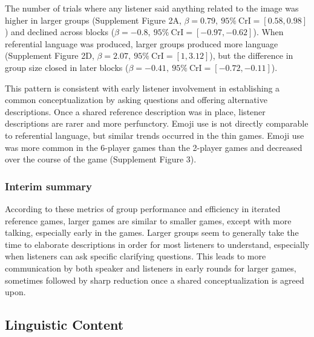 \documentclass[
  english,
  a4paper,
]{article}
\begin{document}
The number of trials where any listener said anything related to the image was higher in larger groups (Supplement Figure 2A, \(\beta=0.79,\:95\%\:\mathrm{CrI}=[0.58, 0.98]\)) and declined across blocks (\(\beta=-0.8,\:95\%\:\mathrm{CrI}=[-0.97, -0.62]\)). When referential language was produced, larger groups produced more language (Supplement Figure 2D, \(\beta=2.07,\:95\%\:\mathrm{CrI}=[1, 3.12]\)), but the difference in group size closed in later blocks (\(\beta=-0.41,\:95\%\:\mathrm{CrI}=[-0.72, -0.11]\)).

This pattern is consistent with early listener involvement in establishing a common conceptualization by asking questions and offering alternative descriptions. Once a shared reference description was in place, listener descriptions are rarer and more perfunctory.
Emoji use is not directly comparable to referential language, but similar trends occurred in the thin games.
Emoji use was more common in the 6-player games than the 2-player games and decreased over the course of the game (Supplement Figure 3).

\hypertarget{interim-summary}{%
\subsubsection{Interim summary}\label{interim-summary}}

According to these metrics of group performance and efficiency in iterated reference games, larger games are similar to smaller games, except with more talking, especially early in the games. Larger groups seem to generally take the time to elaborate descriptions in order for most listeners to understand, especially when listeners can ask specific clarifying questions. This leads to more communication by both speaker and listeners in early rounds for larger games, sometimes followed by sharp reduction once a shared conceptualization is agreed upon.

\hypertarget{linguistic-content}{%
\subsection{Linguistic Content}\label{linguistic-content}}
\end{document}
